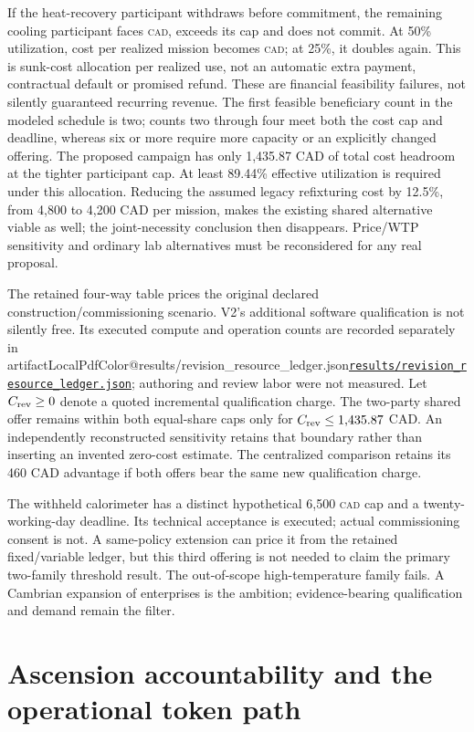\documentclass[11pt,letterpaper]{article}
\makeatletter
\newcommand{\CAD}{\textsc{cad}}
\newcommand{\artifact}[1]{\begingroup\ifcsname artifactLocalPdfColor@#1\endcsname\hypersetup{urlcolor=cyan}\fi\href{\csname artifacturl@#1\endcsname}{\nolinkurl{#1}}\endgroup}
\makeatother
\begin{document}
If the heat-recovery participant withdraws before commitment, the remaining cooling participant faces \WithdrawalCost{} \CAD{}, exceeds its cap and does not commit. At 50\% utilization, cost per realized mission becomes \SharedCost{} \CAD{}; at 25\%, it doubles again. This is sunk-cost allocation per realized use, not an automatic extra payment, contractual default or promised refund. These are financial feasibility failures, not silently guaranteed recurring revenue. The first feasible beneficiary count in the modeled schedule is two; counts two through four meet both the cost cap and deadline, whereas six or more require more capacity or an explicitly changed offering. The proposed campaign has only 1,435.87 CAD of total cost headroom at the tighter participant cap. At least 89.44\% effective utilization is required under this allocation. Reducing the assumed legacy refixturing cost by 12.5\%, from 4,800 to 4,200 CAD per mission, makes the existing shared alternative viable as well; the joint-necessity conclusion then disappears. Price/WTP sensitivity and ordinary lab alternatives must be reconsidered for any real proposal.

The retained four-way table prices the original declared construction/commissioning scenario. V2's additional software qualification is not silently free. Its executed compute and operation counts are recorded separately in \artifact{results/revision_resource_ledger.json}; authoring and review labor were not measured. Let $C_{\rm rev}\geq0$ denote a quoted incremental qualification charge. The two-party shared offer remains within both equal-share caps only for $C_{\rm rev}\leq1{,}435.87$ CAD. An independently reconstructed sensitivity retains that boundary rather than inserting an invented zero-cost estimate. The centralized comparison retains its 460 CAD advantage if both offers bear the same new qualification charge.

The withheld calorimeter has a distinct hypothetical 6,500 \CAD{} cap and a twenty-working-day deadline. Its technical acceptance is executed; actual commissioning consent is not. A same-policy extension can price it from the retained fixed/variable ledger, but this third offering is not needed to claim the primary two-family threshold result. The out-of-scope high-temperature family fails. A Cambrian expansion of enterprises is the ambition; evidence-bearing qualification and demand remain the filter.

\section{Ascension accountability and the operational token path}
\label{sec:contracts}
\end{document}
